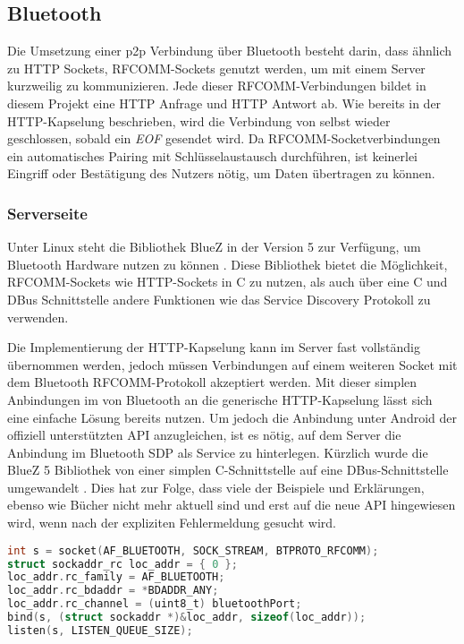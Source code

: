         \subsection{Bluetooth}
        Die Umsetzung einer p2p Verbindung über Bluetooth besteht darin, dass ähnlich zu HTTP Sockets, RFCOMM-Sockets genutzt werden, um mit einem Server kurzweilig zu kommunizieren. Jede dieser RFCOMM-Verbindungen bildet in diesem Projekt eine HTTP Anfrage und HTTP Antwort ab. Wie bereits in der HTTP-Kapselung beschrieben, wird die Verbindung von selbst wieder geschlossen, sobald ein {\it EOF} gesendet wird. Da RFCOMM-Socketverbindungen ein automatisches Pairing mit Schlüsselaustausch durchführen, ist keinerlei Eingriff oder Bestätigung des Nutzers nötig, um Daten übertragen zu können.
        
        \subsubsection{Serverseite}        
        Unter Linux steht die Bibliothek BlueZ in der Version 5 zur Verfügung, um Bluetooth Hardware nutzen zu können \cite{bluezMigration}. Diese Bibliothek bietet die Möglichkeit, RFCOMM-Sockets wie HTTP-Sockets in C zu nutzen, als auch über eine C und DBus Schnittstelle andere Funktionen wie das Service Discovery Protokoll zu verwenden.
        
        Die Implementierung der HTTP-Kapselung kann im Server fast vollständig \linebreak übernommen werden, jedoch müssen Verbindungen auf einem weiteren Socket mit dem Bluetooth RFCOMM-Protokoll akzeptiert werden. Mit dieser simplen Anbindungen im  von Bluetooth an die generische HTTP-Kapselung lässt sich eine einfache Lösung bereits nutzen. Um jedoch die Anbindung unter Android der offiziell unterstützten API anzugleichen, ist es nötig, auf dem Server die Anbindung im Bluetooth SDP als Service zu hinterlegen. Kürzlich wurde die BlueZ 5 Bibliothek von einer simplen C-Schnittstelle auf eine DBus-Schnittstelle umgewandelt \cite{bluezMigration}. Dies hat zur Folge, dass viele der Beispiele und Erklärungen, ebenso wie Bücher nicht mehr aktuell sind und erst auf die neue API hingewiesen wird, wenn nach der expliziten Fehlermeldung gesucht wird.

        \begin{lstlisting}[frame=bt, label={lst:bluetooth:socket}, language=C, caption=Verbindungsaufbau mit Bluetooth (Servercode in C)]
int s = socket(AF_BLUETOOTH, SOCK_STREAM, BTPROTO_RFCOMM);
struct sockaddr_rc loc_addr = { 0 };
loc_addr.rc_family = AF_BLUETOOTH;
loc_addr.rc_bdaddr = *BDADDR_ANY;
loc_addr.rc_channel = (uint8_t) bluetoothPort;
bind(s, (struct sockaddr *)&loc_addr, sizeof(loc_addr));
listen(s, LISTEN_QUEUE_SIZE);
        \end{lstlisting}        
        
